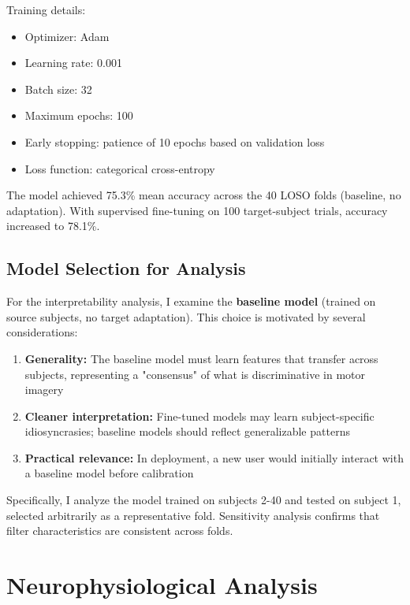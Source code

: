 Training details:
\begin{itemize}
    \item Optimizer: Adam
    \item Learning rate: 0.001
    \item Batch size: 32
    \item Maximum epochs: 100
    \item Early stopping: patience of 10 epochs based on validation loss
    \item Loss function: categorical cross-entropy
\end{itemize}

The model achieved 75.3\% mean accuracy across the 40 LOSO folds (baseline, no adaptation). With supervised fine-tuning on 100 target-subject trials, accuracy increased to 78.1\%.


\subsection{Model Selection for Analysis}
\label{subsec:methods_model_selection}

For the interpretability analysis, I examine the \textbf{baseline model} (trained on source subjects, no target adaptation). This choice is motivated by several considerations:

\begin{enumerate}
    \item \textbf{Generality:} The baseline model must learn features that transfer across subjects, representing a "consensus" of what is discriminative in motor imagery
    \item \textbf{Cleaner interpretation:} Fine-tuned models may learn subject-specific idiosyncrasies; baseline models should reflect generalizable patterns
    \item \textbf{Practical relevance:} In deployment, a new user would initially interact with a baseline model before calibration
\end{enumerate}

Specifically, I analyze the model trained on subjects 2-40 and tested on subject 1, selected arbitrarily as a representative fold. Sensitivity analysis confirms that filter characteristics are consistent across folds.


\section{Neurophysiological Analysis}
\label{sec:methods_neuro}

